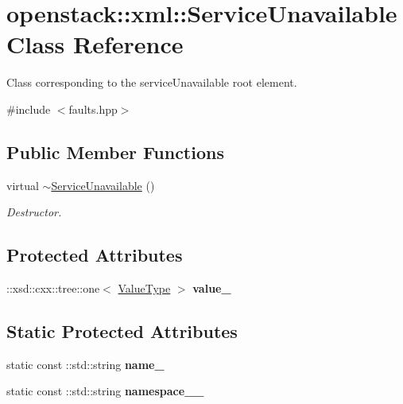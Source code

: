 \hypertarget{classopenstack_1_1xml_1_1ServiceUnavailable}{
\section{openstack::xml::ServiceUnavailable Class Reference}
\label{classopenstack_1_1xml_1_1ServiceUnavailable}
}


Class corresponding to the serviceUnavailable root element.  




{\ttfamily \#include $<$faults.hpp$>$}

\subsection*{Public Member Functions}
\begin{DoxyCompactItemize}
\item 
\hypertarget{classopenstack_1_1xml_1_1ServiceUnavailable_a27cfd2151728608b4e63b65279737e54}{
virtual \hyperlink{classopenstack_1_1xml_1_1ServiceUnavailable_a27cfd2151728608b4e63b65279737e54}{$\sim$ServiceUnavailable} ()}
\label{classopenstack_1_1xml_1_1ServiceUnavailable_a27cfd2151728608b4e63b65279737e54}

\begin{DoxyCompactList}\small\item\em Destructor. \item\end{DoxyCompactList}\end{DoxyCompactItemize}
\subsection*{Protected Attributes}
\begin{DoxyCompactItemize}
\item 
\hypertarget{classopenstack_1_1xml_1_1ServiceUnavailable_a9db613dc3dd5b862b9dbe1d1258f40c2}{
::xsd::cxx::tree::one$<$ \hyperlink{classopenstack_1_1xml_1_1ServiceUnavailableAPIFault}{ValueType} $>$ {\bfseries value\_\-}}
\label{classopenstack_1_1xml_1_1ServiceUnavailable_a9db613dc3dd5b862b9dbe1d1258f40c2}

\end{DoxyCompactItemize}
\subsection*{Static Protected Attributes}
\begin{DoxyCompactItemize}
\item 
\hypertarget{classopenstack_1_1xml_1_1ServiceUnavailable_a9d281429bd4cdcd1c11395083f0887b4}{
static const ::std::string {\bfseries name\_\-}}
\label{classopenstack_1_1xml_1_1ServiceUnavailable_a9d281429bd4cdcd1c11395083f0887b4}

\item 
\hypertarget{classopenstack_1_1xml_1_1ServiceUnavailable_a49f3b0b507de2b26bd3fa4944d1b1ebc}{
static const ::std::string {\bfseries namespace\_\-\_\-}}
\label{classopenstack_1_1xml_1_1ServiceUnavailable_a49f3b0b507de2b26bd3fa4944d1b1ebc}

\end{DoxyCompactItemize}
